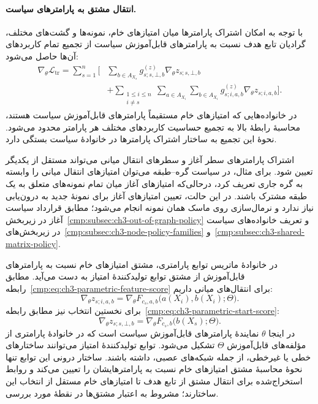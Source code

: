 \paragraph{انتقال مشتق به پارامترهای سیاست.}
با توجه به امکان اشتراک پارامترها میان
امتیازهای خام، نمونه‌ها و گشت‌های مختلف،
گرادیان تابع هدف نسبت به پارامترهای
قابل‌آموزش سیاست از تجمیع تمام کاربردهای
آن‌ها حاصل می‌شود:
\begin{equation}\label{cmp:eq:ch3-gradient-parameter-chain}
\boxed{\begin{aligned}
\nabla_\theta\mathcal L_{\mathrm{tr}}
=\sum_{s=1}^{n}\Bigg[
&\sum_{b\in A_{X_s}}g_{s;s,\bot,b}^{(z)}
\nabla_\theta z_{s;s,\bot,b}\\
&+\sum_{\substack{1\le i\le n\\i\ne s}}
\sum_{a\in A_{X_i}}\sum_{b\in A_{X_i}}
g_{s;i,a,b}^{(z)}\nabla_\theta z_{s;i,a,b}
\Bigg].
\end{aligned}}
\end{equation}
در خانواده‌هایی که امتیازهای خام مستقیماً
پارامترهای قابل‌آموزش سیاست هستند،
محاسبهٔ رابطهٔ بالا به تجمیع حساسیت
کاربردهای مختلف هر پارامتر محدود می‌شود.
نحوهٔ این تجمیع به ساختار اشتراک پارامترها
در خانوادهٔ سیاست بستگی دارد.

اشتراک پارامترهای سطر آغاز و سطرهای انتقال
میانی می‌تواند مستقل از یکدیگر تعیین شود.
برای مثال، در سیاست گره--طبقه می‌توان
امتیازهای انتقال میانی را وابسته به گره
جاری تعریف کرد، درحالی‌که امتیازهای آغاز
میان تمام نمونه‌های متعلق به یک طبقه
مشترک باشند. در این حالت، تعیین امتیازهای
آغاز برای نمونهٔ جدید به درون‌یابی نیاز
ندارد و نرمال‌سازی روی ماسک همان نمونه انجام
می‌شود؛ مطابق قرارداد سیاست آغاز در
زیربخش~\ref{cmp:subsec:ch3-out-of-graph-policy}
و تعریف خانواده‌های سیاست در
زیربخش‌های~\ref{cmp:subsec:ch3-node-policy-families}
و~\ref{cmp:subsec:ch3-shared-matrix-policy}.

در خانوادهٔ ماتریس توابع پارامتری، مشتق
امتیازهای خام نسبت به پارامترهای قابل‌آموزش
از مشتق توابع تولیدکنندهٔ امتیاز به دست
می‌آید. مطابق
رابطه~\eqref{cmp:eq:ch3-parametric-feature-score}
برای انتقال‌های میانی داریم:
\[
\nabla_\theta z_{s;i,a,b}
=\nabla_\theta F_{c_s,a,b}
\bigl(a(X_i),b(X_i);\Theta\bigr).
\]
برای نخستین انتخاب نیز مطابق
رابطه~\eqref{cmp:eq:ch3-parametric-start-score}:
\[
\nabla_\theta z_{s;s,\bot,b}
=\nabla_\theta F_{c_s,b}
\bigl(b(X_s);\Theta\bigr).
\]
در اینجا $\theta$ نمایندهٔ پارامترهای
قابل‌آموزش سیاست است که در خانوادهٔ
پارامتری از مؤلفه‌های قابل‌آموزش $\Theta$
تشکیل می‌شود. توابع تولیدکنندهٔ امتیاز
می‌توانند ساختارهای خطی یا غیرخطی، از جمله
شبکه‌های عصبی، داشته باشند. ساختار درونی
این توابع تنها نحوهٔ محاسبهٔ مشتق امتیازهای
خام نسبت به پارامترهایشان را تعیین می‌کند
و روابط استخراج‌شده برای انتقال مشتق از
تابع هدف تا امتیازهای خام مستقل از انتخاب
این ساختارند؛ مشروط به اعتبار مشتق‌ها در
نقطهٔ مورد بررسی.

